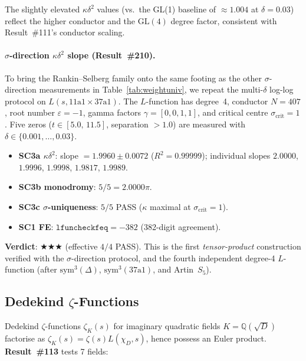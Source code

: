 \documentclass[11pt, a4paper]{article}
\theoremstyle{plain}
\theoremstyle{definition}
\begin{document}
The slightly elevated $\kappa\delta^{2}$ values (vs.\ the GL(1) baseline of
$\approx 1.004$ at $\delta=0.03$) reflect the higher conductor and the
$\mathrm{GL}(4)$ degree factor, consistent with Result~\#111's
conductor scaling.

\paragraph{$\sigma$-direction $\kappa\delta^{2}$ slope (Result~\#210).}
To bring the Rankin--Selberg family onto the same footing as the other
$\sigma$-direction measurements in Table~\ref{tab:weightuniv}, we repeat
the multi-$\delta$ log-log protocol on $L(s, \text{11a1}\times\text{37a1})$.
The $L$-function has degree~4, conductor $N=407$, root number
$\varepsilon=-1$, gamma factors $\gamma=[0,0,1,1]$, and critical centre
$\sigma_{\mathrm{crit}}=1$.  Five zeros ($t\in[5.0,\,11.5]$, separation $>1.0$)
are measured with $\delta\in\{0.001,\ldots,0.03\}$.
\begin{itemize}
  \item \textbf{SC3a $\kappa\delta^{2}$}: slope $= 1.9960 \pm 0.0072$
    ($R^{2}=0.99999$); individual slopes
    $2.0000$, $1.9996$, $1.9998$, $1.9817$, $1.9989$.
  \item \textbf{SC3b monodromy}: $5/5 = 2.0000\pi$.
  \item \textbf{SC3c $\sigma$-uniqueness}: $5/5$ PASS
    ($\kappa$ maximal at $\sigma_{\mathrm{crit}}=1$).
  \item \textbf{SC1 FE}: $\texttt{lfuncheckfeq}=-382$ (382-digit agreement).
\end{itemize}
\textbf{Verdict}: $\bigstar\bigstar\bigstar$ (effective $4/4$ PASS).
This is the first \emph{tensor-product} construction verified with the
$\sigma$-direction protocol, and the fourth independent degree-4
$L$-function (after $\mathrm{sym}^{3}(\Delta)$,
$\mathrm{sym}^{3}(\text{37a1})$, and Artin~$S_5$).


\subsection{Dedekind $\zeta$-Functions}
\label{sec:dedekind}

Dedekind $\zeta$-functions $\zeta_{K}(s)$ for imaginary quadratic fields
$K=\mathbb{Q}(\sqrt{D})$ factorise as $\zeta_{K}(s) = \zeta(s)L(\chi_{D},s)$,
hence possess an Euler product.  \textbf{Result~\#113} tests 7 fields:
\end{document}
